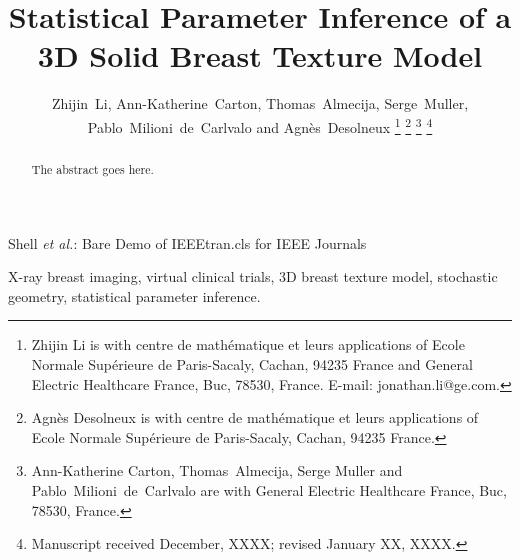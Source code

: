 \documentclass[journal]{IEEEtran}
\begin{document}
\title{Statistical Parameter Inference of a 3D Solid Breast Texture
  Model} %

\author{Zhijin~Li, Ann-Katherine~Carton, Thomas~Almecija,
  Serge~Muller, Pablo~Milioni~de~Carlvalo and
  Agnès~Desolneux%
  \thanks{Zhijin Li is with centre de math\'{e}matique et leurs
    applications of Ecole Normale Sup\'{e}rieure de Paris-Sacaly,
    Cachan, 94235 France and General Electric Healthcare France, Buc,
    78530, France. E-mail:
    jonathan.li@ge.com.}%
  \thanks{Agnès Desolneux is with centre de math\'{e}matique et leurs
    applications of Ecole Normale Sup\'{e}rieure de Paris-Sacaly,
    Cachan, 94235 France.}%
  \thanks{Ann-Katherine Carton, Thomas~Almecija, Serge Muller and
    Pablo~Milioni~de~Carlvalo are with General Electric Healthcare
    France, Buc, 78530, France.}%
  \thanks{Manuscript received December, XXXX; revised January XX,
    XXXX.}}

%
{Shell \MakeLowercase{\textit{et al.}}: Bare Demo of IEEEtran.cls for
  IEEE Journals}
%



\maketitle

\begin{abstract}
  The abstract goes here.
\end{abstract}

\begin{IEEEkeywords}
  X-ray breast imaging, virtual clinical trials, 3D breast texture
  model, stochastic geometry, statistical parameter inference.
\end{IEEEkeywords}
\end{document}
